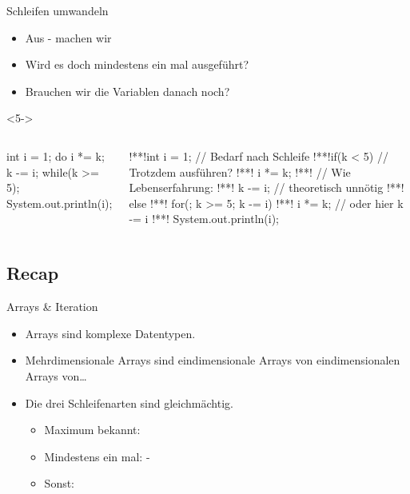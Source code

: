 {\begin{frame}[fragile,c]{Schleifen umwandeln}
\begin{itemize}[<+(1)->]
   \itemsep3pt
   \item Aus - machen wir 
   \item Wird es doch mindestens ein mal ausgeführt?
   \item Brauchen wir die Variablen danach noch?
\end{itemize}
\begin{uncoverenv}<5->
\begin{columns}[onlytextwidth,c]
\begin{plainjava}
int i = 1;
do {
  i *= k;
  k -= i;
} while(k >= 5);
System.out.println(i);
\end{plainjava}
\vspace*{-1.15\baselineskip}\par\null\qquad\paletteA{\faCaretRight}
\begin{plainjava}
!**!int i = 1; // Bedarf nach Schleife
!**!if(k < 5) { // Trotzdem ausführen?
!**!   i *= k;
!**!   // Wie Lebenserfahrung:
!**!   k -= i; // theoretisch unnötig
!**!} else {
!**!   for(; k >= 5; k -= i)
!**!      i *= k; // oder hier k -= i
!**!}
System.out.println(i);
\end{plainjava}
\end{columns}
\end{uncoverenv}
\end{frame}
\SidebarReset

\subsection{Recap}
\def\mto{\ensuremath{\to}}
\begin{frame}[c]{\hfill Arrays \& Iteration}
\begin{itemize}[<+(1)->]
   \itemsep18pt
   \item Arrays sind komplexe Datentypen.
   \item Mehrdimensionale Arrays sind eindimensionale Arrays von eindimensionalen Arrays von\ldots
   \item Die drei Schleifenarten sind gleichmächtig. \begin{itemize}
      \item Maximum bekannt: 
      \item Mindestens ein mal: -
      \item Sonst: 
   \end{itemize}
\end{itemize}
\LargeSide
\end{frame}

}
